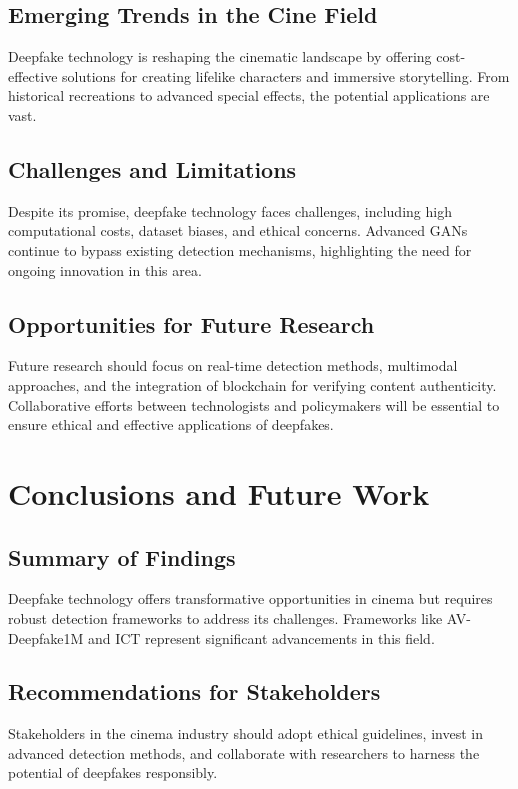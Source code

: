 \documentclass[12pt]{article}
\begin{document}
\subsection{Emerging Trends in the Cine Field}
Deepfake technology is reshaping the cinematic landscape by offering cost-effective solutions for creating lifelike characters and immersive storytelling. From historical recreations to advanced special effects, the potential applications are vast.

\subsection{Challenges and Limitations}
Despite its promise, deepfake technology faces challenges, including high computational costs, dataset biases, and ethical concerns. Advanced GANs continue to bypass existing detection mechanisms, highlighting the need for ongoing innovation in this area.

\subsection{Opportunities for Future Research}
Future research should focus on real-time detection methods, multimodal approaches, and the integration of blockchain for verifying content authenticity. Collaborative efforts between technologists and policymakers will be essential to ensure ethical and effective applications of deepfakes.

\section{Conclusions and Future Work}
\subsection{Summary of Findings}
Deepfake technology offers transformative opportunities in cinema but requires robust detection frameworks to address its challenges. Frameworks like AV-Deepfake1M and ICT represent significant advancements in this field.

\subsection{Recommendations for Stakeholders}
Stakeholders in the cinema industry should adopt ethical guidelines, invest in advanced detection methods, and collaborate with researchers to harness the potential of deepfakes responsibly.
\end{document}
